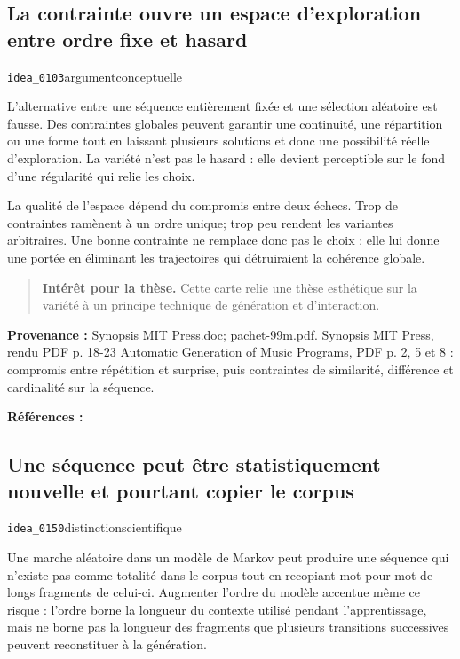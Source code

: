 \documentclass[10pt,a4paper]{article}
\begin{document}
\subsection{La contrainte ouvre un espace d'exploration entre ordre fixe et hasard}
{\small\color{metadata} \texttt{idea\_0103}\quad\textbullet\quad argument\quad\textbullet\quad conceptuelle\par}

L'alternative entre une séquence entièrement fixée et une sélection aléatoire est fausse. Des contraintes globales peuvent garantir une continuité, une répartition ou une forme tout en laissant plusieurs solutions et donc une possibilité réelle d'exploration. La variété n'est pas le hasard : elle devient perceptible sur le fond d'une régularité qui relie les choix.

La qualité de l'espace dépend du compromis entre deux échecs. Trop de contraintes ramènent à un ordre unique; trop peu rendent les variantes arbitraires. Une bonne contrainte ne remplace donc pas le choix : elle lui donne une portée en éliminant les trajectoires qui détruiraient la cohérence globale.

\begin{quote}
\textbf{Intérêt pour la thèse.} Cette carte relie une thèse esthétique sur la variété à un principe technique de génération et d'interaction.
\end{quote}
{\footnotesize\color{metadata}\textbf{Provenance :} Synopsis MIT Press.doc; pachet-99m.pdf. Synopsis MIT Press, rendu PDF p. 18-23 Automatic Generation of Music Programs, PDF p. 2, 5 et 8 : compromis entre répétition et surprise, puis contraintes de similarité, différence et cardinalité sur la séquence.\par}
{\footnotesize\color{metadata}\textbf{Références :} \parencite{pachet1999programs}\par}

\subsection{Une séquence peut être statistiquement nouvelle et pourtant copier le corpus}
{\small\color{metadata} \texttt{idea\_0150}\quad\textbullet\quad distinction\quad\textbullet\quad scientifique\par}

Une marche aléatoire dans un modèle de Markov peut produire une séquence qui n'existe pas comme totalité dans le corpus tout en recopiant mot pour mot de longs fragments de celui-ci. Augmenter l'ordre du modèle accentue même ce risque : l'ordre borne la longueur du contexte utilisé pendant l'apprentissage, mais ne borne pas la longueur des fragments que plusieurs transitions successives peuvent reconstituer à la génération.
\end{document}
